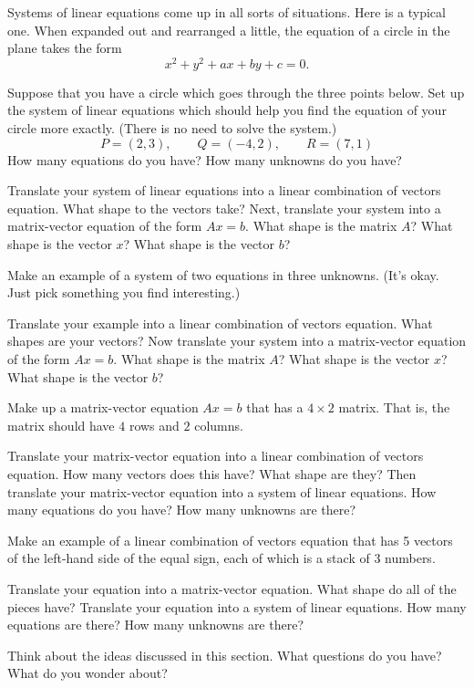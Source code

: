 \documentclass[elementsmain.tex]{subfiles}
\begin{document}
\begin{exercise} 
Systems of linear equations come up in all sorts of situations. Here is a typical one. 
When expanded out and rearranged a little, the equation of a circle in the plane takes the form
\[
x^2 + y^2 + ax + by + c = 0.
\]


Suppose that you have a circle which goes through the three points below. Set up the system of linear equations which should help you find the equation of your circle more exactly. (There is no need to solve the system.)
\[
P = (2,3), \qquad Q = (-4,2), \qquad R= (7,1)
\]
How many equations do you have? How many unknowns do you have?

Translate your system of linear equations into a linear combination of vectors equation. What shape to the vectors take? Next, translate your system into a matrix-vector equation of the form $Ax=b$. What shape is the matrix $A$? What shape is the vector $x$? What shape is the vector $b$? 
\end{exercise}

\begin{exercise}
Make an example of a system of two equations in three unknowns. (It's okay. Just pick something you find interesting.) 

Translate your example into a linear combination of vectors equation. What shapes are your vectors? Now translate your system into a matrix-vector equation of the form $Ax=b$. What shape is the matrix $A$? What shape is the vector $x$? What shape is the vector $b$?
\end{exercise}

\begin{exercise}
Make up a matrix-vector equation $Ax=b$ that has a $4\times 2$ matrix. That is, the matrix should have $4$ rows and $2$ columns.

Translate your matrix-vector equation into a linear combination of vectors equation. How many vectors does this have? What shape are they? Then translate your matrix-vector equation into a system of linear equations. How many equations do you have? How many unknowns are there?
\end{exercise}

\begin{exercise}
Make an example of a linear combination of vectors equation that has 5 vectors of the left-hand side of the equal sign, each of which is a stack of 3 numbers.

Translate your equation into a matrix-vector equation. What shape do all of the pieces have? Translate your equation into a system of linear equations. How many equations are there? How many unknowns are there?
\end{exercise}

\begin{exercise}
Think about the ideas discussed in this section. What questions do you have? What do you wonder about?
\end{exercise}

\clearpage
\end{document}
